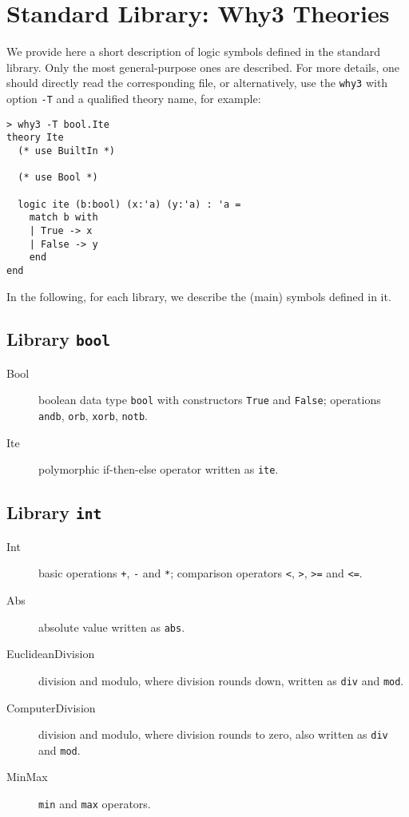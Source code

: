 \chapter{Standard Library: Why3 Theories}
\label{chap:library}

We provide here a short description of logic symbols defined in the
standard library. Only the most general-purpose ones are
described. For more details, one should directly read the
corresponding file, or alternatively, use the \verb|why3| with option
\verb|-T| and a qualified theory name, for example:
\begin{verbatim}
> why3 -T bool.Ite
theory Ite
  (* use BuiltIn *)
  
  (* use Bool *)
  
  logic ite (b:bool) (x:'a) (y:'a) : 'a =
    match b with
    | True -> x
    | False -> y
    end
end
\end{verbatim}

In the following, for each library, we describe the (main) symbols
defined in it.

\section{Library \texttt{bool}}

\begin{description}

\item[Bool] boolean data type \verb|bool| with constructors \verb|True| and
  \verb|False|; operations \verb|andb|, \verb|orb|, \verb|xorb|, \verb|notb|.

\item[Ite] polymorphic if-then-else operator written as \verb|ite|.

\end{description}

\section{Library \texttt{int}}

\begin{description}

\item[Int] basic operations \verb|+|, \verb|-| and \verb|*|; comparison
  operators \verb|<|, \verb|>|, \verb|>=| and \verb|<=|.

\item[Abs] absolute value written as \verb|abs|.

\item[EuclideanDivision] division and modulo, where division rounds
  down, written as \verb|div| and \verb|mod|.

\item[ComputerDivision] division and modulo, where division rounds to
  zero, also written as \verb|div| and \verb|mod|.

\item[MinMax] \verb|min| and \verb|max| operators.

\end{description}

